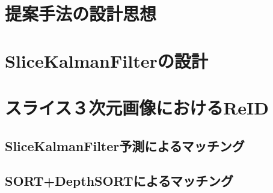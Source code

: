 \section{提案手法の設計思想}

\section{SliceKalmanFilterの設計}

\section{スライス３次元画像におけるReID}

    \subsection{SliceKalmanFilter予測によるマッチング}

    \subsection{SORT+DepthSORTによるマッチング}